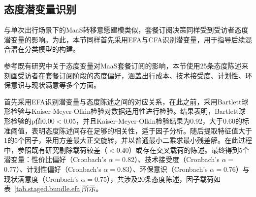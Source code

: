 \subsection{态度潜变量识别}\label{subsec.staged.bundle.lv}

与单次出行场景下的MaaS转移意愿建模类似，套餐订阅决策同样受到受访者态度潜变量的影响\cite{schikofskyExploringMotivationalMechanisms2020,kimInfluenceLatentLifestyle2022,chenExploringTouristPreference2023}。为此，本节同样首先采用EFA与CFA识别潜变量，用于指导后续混合潜在分类模型的构建。

参考既有研究中关于态度变量对MaaS套餐订阅的影响\citep{schikofskyExploringMotivationalMechanisms2020,kimInfluenceLatentLifestyle2022,chenExploringTouristPreference2023}，本节使用25条态度陈述来刻画受访者在套餐订阅阶段的态度偏好，涵盖出行成本、技术接受度、计划性、环保意识与现状满意等多个方面。

首先采用EFA识别潜变量与态度陈述之间的对应关系，在此之前，采用Bartlett球形检验与Kaiser-Meyer-Olkin检验对数据适用性进行检验。结果表明，Bartlett球形检验的p值0.00$<$0.05，并且Kaiser-Meyer-Olkin检验结果为0.92，大于0.60的标准阈值，表明态度陈述间存在足够的相关性，适于因子分析。随后提取特征值大于1的5个因子，采用方差最大正交旋转，并以普通最小二乘求最小残差解。在此过程中，参照既有研究\citep{hairMultivariateDataAnalysis2019}剔除载荷较差（$<$0.40）或存在交叉载荷的陈述。最终得到5个潜变量：性价比偏好（Cronbach's $\alpha=$0.82）、技术接受度（Cronbach's $\alpha=$0.77）、计划性偏好（Cronbach's $\alpha=$0.83）、环保意识（Cronbach's $\alpha=$0.76）与现状满意度（Cronbach's $\alpha=$0.75），共涉及20条态度陈述，因子载荷如表~\ref{tab.staged.bundle.efa}所示。

